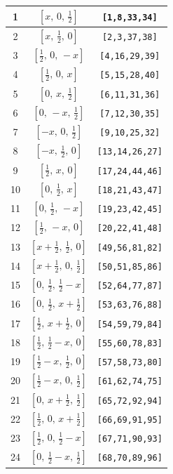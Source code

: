 \documentclass[fleqn,8pt]{jsarticle}
\begin{document}
\begin{longtable}{ccc}
1 & $\left[ x,\, 0,\, \frac{1}{2} \right]$ & {\tt [1,8,33,34]} \\ \hline
2 & $\left[ x,\, \frac{1}{2},\, 0 \right]$ & {\tt [2,3,37,38]} \\ \hline
3 & $\left[ \frac{1}{2},\, 0,\, - x \right]$ & {\tt [4,16,29,39]} \\ \hline
4 & $\left[ \frac{1}{2},\, 0,\, x \right]$ & {\tt [5,15,28,40]} \\ \hline
5 & $\left[ 0,\, x,\, \frac{1}{2} \right]$ & {\tt [6,11,31,36]} \\ \hline
6 & $\left[ 0,\, - x,\, \frac{1}{2} \right]$ & {\tt [7,12,30,35]} \\ \hline
7 & $\left[ - x,\, 0,\, \frac{1}{2} \right]$ & {\tt [9,10,25,32]} \\ \hline
8 & $\left[ - x,\, \frac{1}{2},\, 0 \right]$ & {\tt [13,14,26,27]} \\ \hline
9 & $\left[ \frac{1}{2},\, x,\, 0 \right]$ & {\tt [17,24,44,46]} \\ \hline
10 & $\left[ 0,\, \frac{1}{2},\, x \right]$ & {\tt [18,21,43,47]} \\ \hline
11 & $\left[ 0,\, \frac{1}{2},\, - x \right]$ & {\tt [19,23,42,45]} \\ \hline
12 & $\left[ \frac{1}{2},\, - x,\, 0 \right]$ & {\tt [20,22,41,48]} \\ \hline
13 & $\left[ x + \frac{1}{2},\, \frac{1}{2},\, 0 \right]$ & {\tt [49,56,81,82]} \\ \hline
14 & $\left[ x + \frac{1}{2},\, 0,\, \frac{1}{2} \right]$ & {\tt [50,51,85,86]} \\ \hline
15 & $\left[ 0,\, \frac{1}{2},\, \frac{1}{2} - x \right]$ & {\tt [52,64,77,87]} \\ \hline
16 & $\left[ 0,\, \frac{1}{2},\, x + \frac{1}{2} \right]$ & {\tt [53,63,76,88]} \\ \hline
17 & $\left[ \frac{1}{2},\, x + \frac{1}{2},\, 0 \right]$ & {\tt [54,59,79,84]} \\ \hline
18 & $\left[ \frac{1}{2},\, \frac{1}{2} - x,\, 0 \right]$ & {\tt [55,60,78,83]} \\ \hline
19 & $\left[ \frac{1}{2} - x,\, \frac{1}{2},\, 0 \right]$ & {\tt [57,58,73,80]} \\ \hline
20 & $\left[ \frac{1}{2} - x,\, 0,\, \frac{1}{2} \right]$ & {\tt [61,62,74,75]} \\ \hline
21 & $\left[ 0,\, x + \frac{1}{2},\, \frac{1}{2} \right]$ & {\tt [65,72,92,94]} \\ \hline
22 & $\left[ \frac{1}{2},\, 0,\, x + \frac{1}{2} \right]$ & {\tt [66,69,91,95]} \\ \hline
23 & $\left[ \frac{1}{2},\, 0,\, \frac{1}{2} - x \right]$ & {\tt [67,71,90,93]} \\ \hline
24 & $\left[ 0,\, \frac{1}{2} - x,\, \frac{1}{2} \right]$ & {\tt [68,70,89,96]} \\
\end{longtable}
\end{document}
